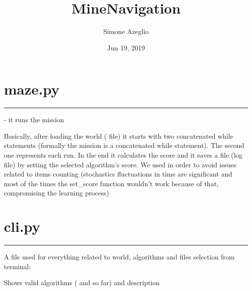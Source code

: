 \documentclass[letterpaper,10pt,english]{sphinxmanual}
\title{MineNavigation}
\date{Jun 19, 2019}
\author{Simone Azeglio}
\begin{document}
\pagestyle{empty}
\sphinxmaketitle
\pagestyle{plain}
\sphinxtableofcontents
\pagestyle{normal}
\label{\detokenize{index::doc}}


\chapter{maze.py}
\label{\detokenize{index:maze-py}}

\bigskip\hrule\bigskip


 - it runs the mission

Basically, after loading the world ( file) it starts with two concatenated while statements (formally the mission is a concatenated while statement).
The second one represents each run. In the end it calculates the score and it saves a  file (log file) by setting the selected algorithm’s score.
We used  in order to avoid issues related to items counting (stochastics fluctuations in time are significant and most of the times the set\_score
function wouldn’t work because of that, compromising the learning process)
\label{\detokenize{index:module-cli}}

\chapter{cli.py}
\label{\detokenize{index:cli-py}}

\bigskip\hrule\bigskip


A file used for everything related to world, algorithms and files selection from terminal:

\begin{fulllineitems}
\label{\detokenize{index:cli.valid_algorithms}}
Shows valid algorithms ( and  so far) and description

\end{fulllineitems}

\end{document}
